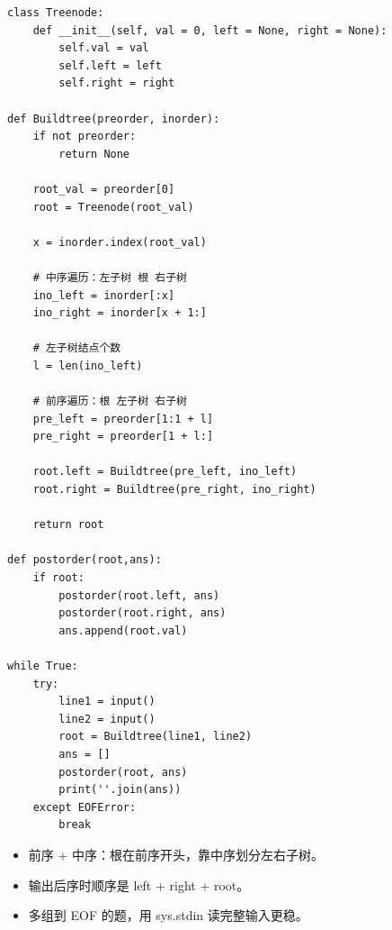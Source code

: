 \documentclass[10pt,a4paper,fontset=none]{ctexart}
\begin{document}
\begin{lstlisting}[style=py,caption={最终可用代码（对话来源）}]
class Treenode:
    def __init__(self, val = 0, left = None, right = None):
        self.val = val
        self.left = left
        self.right = right

def Buildtree(preorder, inorder):
    if not preorder:
        return None

    root_val = preorder[0]
    root = Treenode(root_val)

    x = inorder.index(root_val)

    # 中序遍历：左子树 根 右子树
    ino_left = inorder[:x]
    ino_right = inorder[x + 1:]

    # 左子树结点个数
    l = len(ino_left)

    # 前序遍历：根 左子树 右子树
    pre_left = preorder[1:1 + l]
    pre_right = preorder[1 + l:]

    root.left = Buildtree(pre_left, ino_left)
    root.right = Buildtree(pre_right, ino_right)

    return root

def postorder(root,ans):
    if root:
        postorder(root.left, ans)
        postorder(root.right, ans)
        ans.append(root.val)

while True:
    try:
        line1 = input()
        line2 = input()
        root = Buildtree(line1, line2)
        ans = []
        postorder(root, ans)
        print(''.join(ans))
    except EOFError:
        break
\end{lstlisting}
\begin{notebox}
\begin{itemize}
  \item 前序 + 中序：根在前序开头，靠中序划分左右子树。
  \item 输出后序时顺序是 left + right + root。
  \item 多组到 EOF 的题，用 sys.stdin 读完整输入更稳。
\end{itemize}
\end{notebox}
\end{document}
